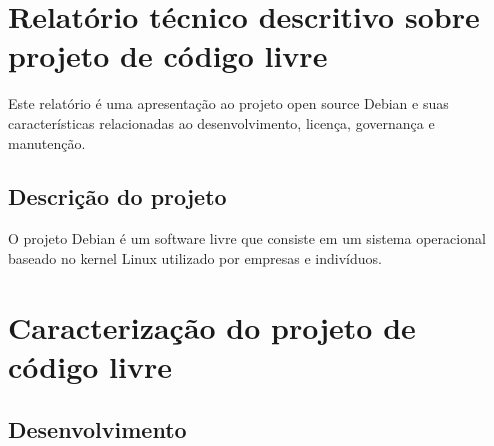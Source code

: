 \documentclass[12pt,a4paper]{article} %
\newcommand\BackgroundStructure{ %
\setlength{\unitlength}{1mm} %

\setlength\fboxsep{0mm} %
\setlength\fboxrule{0.5mm} %
\put(10, 20pr){\fcolorbox{black}{gray!5}{\framebox(155,247){}}} %
\put(165, 20){\fcolorbox{black}{gray!10}{\framebox(37,247){}}} %
\put(10, 262){\fcolorbox{black}{white!10}{\framebox(192, 25){}}} %
\put(175, 263){\texttt{[image: ]}} %
}
\begin{document}


\section{Relat\'orio t\'ecnico descritivo sobre projeto de c\'odigo livre} 

	Este relatório é uma apresentação ao projeto open source Debian e suas características relacionadas ao desenvolvimento, licença, governança e manutenção.

\subsection{Descrição do projeto}

	O projeto Debian é um software livre que consiste em um sistema operacional baseado no kernel Linux utilizado por empresas e indivíduos.


\section{Caracterização do projeto de código livre} 


\subsection{Desenvolvimento}
\end{document}

